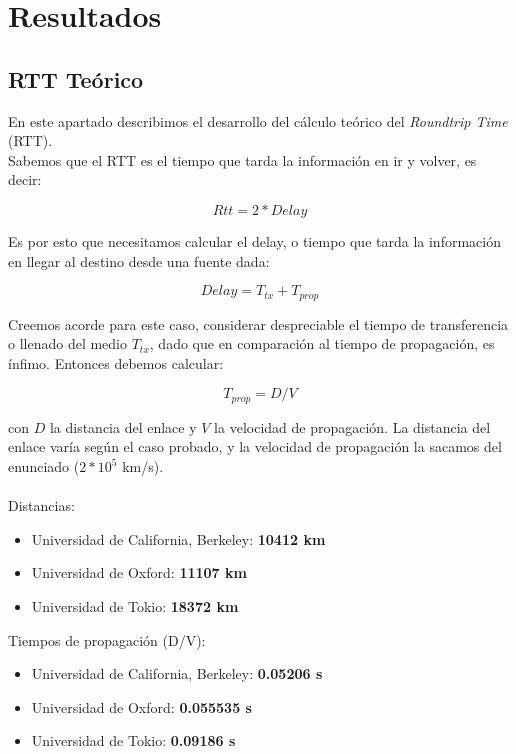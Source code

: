 \section{Resultados}

\subsection{RTT Teórico}

En este apartado describimos el desarrollo del cálculo teórico del \textit{Roundtrip Time} (RTT).
\\
Sabemos que el RTT es el tiempo que tarda la información en ir y volver, es decir:

\begin{equation}
	Rtt = 2 * Delay
\end{equation}

Es por esto que necesitamos calcular el delay, o tiempo que tarda la información en llegar al destino desde una fuente dada:

\begin{equation}
	Delay = T_{tx} + T_{prop}
\end{equation}

Creemos acorde para este caso, considerar despreciable el tiempo de transferencia o llenado del medio $T_{tx}$, dado que en comparación al tiempo de propagación, es ínfimo. Entonces debemos calcular:

\begin{equation}
	T_{prop} = D/V
\end{equation}

con $D$ la distancia del enlace y $V$ la velocidad de propagación. La distancia del enlace varía según el caso probado, y la velocidad de propagación la sacamos del enunciado ($2*10^5$ km/s).\\
\\
Distancias:
\begin{itemize}
	\item Universidad de California, Berkeley: \textbf{10412 km}
	\item Universidad de Oxford: \textbf{11107 km}
	\item Universidad de Tokio: \textbf{18372 km}
\end{itemize}

Tiempos de propagación (D/V):
\begin{itemize}
	\item Universidad de California, Berkeley: \textbf{0.05206 s}
	\item Universidad de Oxford: \textbf{0.055535 s}
	\item Universidad de Tokio:  \textbf{0.09186 s}
\end{itemize}

